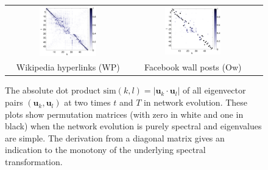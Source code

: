 \documentclass[11pt,a4paper]{book}
\newcommand{\wTwo}{0.48}
\begin{document}
\begin{figure}[h!]
  \centering 
  \begin{tabular}{ccc}
    \includegraphics[width=\wTwo\textwidth]{img-st/evol.permutation_map.sym.wikipedia-growth.u} &
    \includegraphics[width=\wTwo\textwidth]{img-st/evol.permutation_map.sym.facebook-wosn-wall.u} \\
    Wikipedia hyperlinks (\textsf{WP}) &
    Facebook wall posts (\textsf{Ow}) 
  \end{tabular}
  \caption{
    The absolute dot product $\mathrm{sim}(k,l)=|\mathbf u_k \cdot
    \mathbf u_l|$ of all eigenvector pairs $(\mathbf u_k,   
    \mathbf u_l)$ at two times $t$ and $T$ in
    network evolution.  These plots show permutation matrices (with zero in
    white and one in black) when the network evolution is purely spectral
    and eigenvalues are simple.  The derivation from a diagonal matrix
    gives an indication to the monotony of the underlying spectral
    transformation.
  }
  \label{fig:permutation}
\end{figure}
\end{document}

